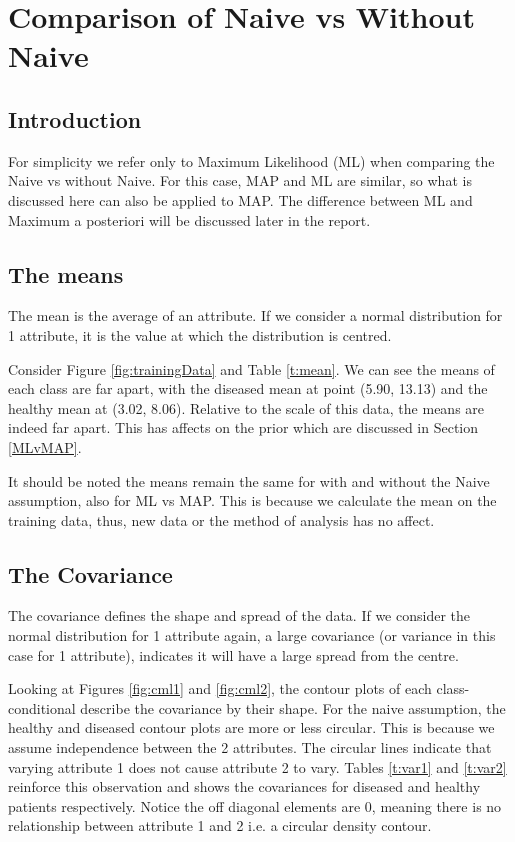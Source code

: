 \section{Comparison of Naive vs Without Naive}{\label{s1}
	
\subsection{Introduction}\label{Int}
For simplicity we refer only to Maximum Likelihood (ML) when comparing the Naive vs without Naive. For this case, MAP and ML are similar, so what is discussed here can also be applied to MAP. The difference between ML and Maximum a posteriori will be discussed later in the report.

\subsection{The means}
The mean is the average of an attribute. If we consider a normal distribution for 1 attribute, it is the value at which the distribution is centred.

Consider Figure \ref{fig:trainingData} and Table \ref{t:mean}. We can see the means of each class are far apart, with the diseased mean at point (5.90, 13.13) and the healthy mean at (3.02, 8.06). Relative to the scale of this data, the means are indeed far apart. This has affects on the prior which are discussed in Section \ref{MLvMAP}.

It should be noted the means remain the same for with and without the Naive assumption, also for ML vs MAP. This is because we calculate the mean on the training data, thus, new data or the method of analysis has no affect.

\subsection{The Covariance}
The covariance defines the shape and spread of the data. If we consider the normal distribution for 1 attribute again, a large covariance (or variance in this case for 1 attribute), indicates it will have a large spread from the centre. 

Looking at Figures \ref{fig:cml1} and \ref{fig:cml2}, the contour plots of each class-conditional describe the covariance by their shape. For the naive assumption, the healthy and diseased contour plots are more or less circular. This is because we assume independence between the 2 attributes. The circular lines indicate that varying attribute 1 does not cause attribute 2 to vary. Tables \ref{t:var1} and \ref{t:var2} reinforce this observation and shows the covariances for diseased and healthy patients respectively. Notice the off diagonal elements are 0, meaning there is no relationship between attribute 1 and 2 i.e. a circular density contour. 

}
